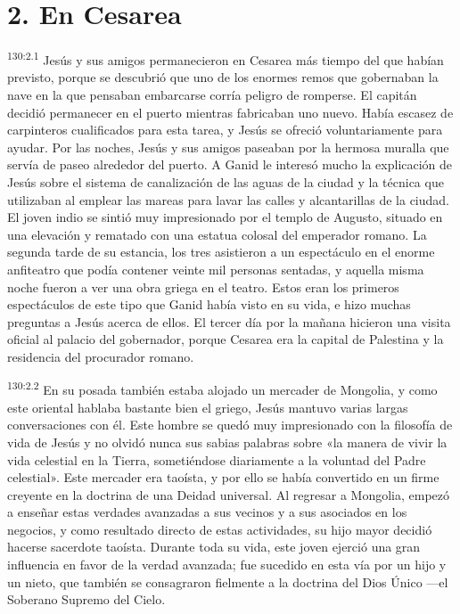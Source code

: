 \section*{2. En Cesarea}
\par 
\textsuperscript{130:2.1} Jesús y sus amigos permanecieron en Cesarea más tiempo del que habían previsto, porque se descubrió que uno de los enormes remos que gobernaban la nave en la que pensaban embarcarse corría peligro de romperse. El capitán decidió permanecer en el puerto mientras fabricaban uno nuevo. Había escasez de carpinteros cualificados para esta tarea, y Jesús se ofreció voluntariamente para ayudar. Por las noches, Jesús y sus amigos paseaban por la hermosa muralla que servía de paseo alrededor del puerto. A Ganid le interesó mucho la explicación de Jesús sobre el sistema de canalización de las aguas de la ciudad y la técnica que utilizaban al emplear las mareas para lavar las calles y alcantarillas de la ciudad. El joven indio se sintió muy impresionado por el templo de Augusto, situado en una elevación y rematado con una estatua colosal del emperador romano. La segunda tarde de su estancia, los tres asistieron a un espectáculo en el enorme anfiteatro que podía contener veinte mil personas sentadas, y aquella misma noche fueron a ver una obra griega en el teatro. Estos eran los primeros espectáculos de este tipo que Ganid había visto en su vida, e hizo muchas preguntas a Jesús acerca de ellos. El tercer día por la mañana hicieron una visita oficial al palacio del gobernador, porque Cesarea era la capital de Palestina y la residencia del procurador romano.

\par 
\textsuperscript{130:2.2} En su posada también estaba alojado un mercader de Mongolia, y como este oriental hablaba bastante bien el griego, Jesús mantuvo varias largas conversaciones con él. Este hombre se quedó muy impresionado con la filosofía de vida de Jesús y no olvidó nunca sus sabias palabras sobre «la manera de vivir la vida celestial en la Tierra, sometiéndose diariamente a la voluntad del Padre celestial». Este mercader era taoísta, y por ello se había convertido en un firme creyente en la doctrina de una Deidad universal. Al regresar a Mongolia, empezó a enseñar estas verdades avanzadas a sus vecinos y a sus asociados en los negocios, y como resultado directo de estas actividades, su hijo mayor decidió hacerse sacerdote taoísta. Durante toda su vida, este joven ejerció una gran influencia en favor de la verdad avanzada; fue sucedido en esta vía por un hijo y un nieto, que también se consagraron fielmente a la doctrina del Dios Único ---el Soberano Supremo del Cielo.

